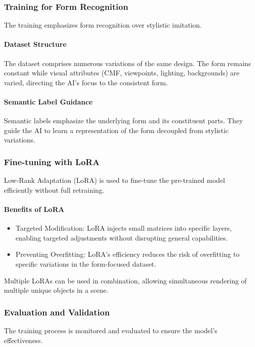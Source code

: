 \documentclass[12pt]{report}
\begin{document}
\subsubsection{Training for Form Recognition}

The training emphasizes form recognition over stylistic imitation.

\paragraph{Dataset Structure}
The dataset comprises numerous variations of the same design. The form remains constant while visual attributes (CMF, viewpoints, lighting, backgrounds) are varied, directing the AI's focus to the consistent form.

\paragraph{Semantic Label Guidance}
Semantic labels emphasize the underlying form and its constituent parts. They guide the AI to learn a representation of the form decoupled from stylistic variations.









\subsubsection{Fine-tuning with LoRA}
Low-Rank Adaptation (LoRA) is used to fine-tune the pre-trained model efficiently without full retraining.

\paragraph{Benefits of LoRA}
\begin{itemize}
    \item Targeted Modification: LoRA injects small matrices into specific layers, enabling targeted adjustments without disrupting general capabilities.
    \item Preventing Overfitting: LoRA's efficiency reduces the risk of overfitting to specific variations in the form-focused dataset.
\end{itemize}

Multiple LoRAs can be used in combination, allowing simultaneous rendering of multiple unique objects in a scene.

\subsubsection{Evaluation and Validation}
The training process is monitored and evaluated to ensure the model's effectiveness.
\end{document}
